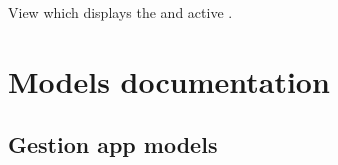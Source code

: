\documentclass[letterpaper,10pt,english]{sphinxmanual}
\begin{document}

\begin{fulllineitems}
\label{\detokenize{modules/views:coopeV3.views.homepage}}
View which displays the {\hyperref[\detokenize{modules/models:preferences.models.GeneralPreferences.home_text}]{}} and active {\hyperref[\detokenize{modules/models:gestion.models.Keg}]{}}.

\end{fulllineitems}



\chapter{Models documentation}
\label{\detokenize{modules/models:models-documentation}}\label{\detokenize{modules/models::doc}}

\section{Gestion app models}
\label{\detokenize{modules/models:module-gestion.models}}\label{\detokenize{modules/models:gestion-app-models}}
\end{document}
